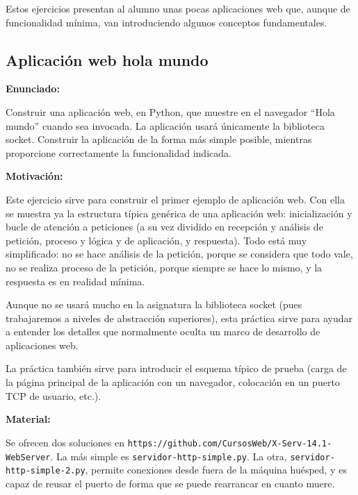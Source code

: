 Estos ejercicios presentan al alumno unas pocas aplicaciones web que, aunque de funcionalidad mínima, van introduciendo algunos conceptos fundamentales.

\subsection{Aplicación web hola mundo}
\label{subsec:aplweb-hola-mundo}

\textbf{Enunciado:}

Construir una aplicación web, en Python, que muestre en el navegador ``Hola mundo'' cuando sea invocada. La aplicación usará únicamente la biblioteca socket. Construir la aplicación de la forma más simple posible, mientras proporcione correctamente la funcionalidad indicada.

\textbf{Motivación:}

Este ejercicio sirve para construir el primer ejemplo de aplicación web. Con ella se muestra ya la estructura típica genérica de una aplicación web: inicialización y bucle de atención a peticiones (a su vez dividido en recepción y análisis de petición, proceso y lógica y de aplicación, y respuesta). Todo está muy simplificado: no se hace análisis de la petición, porque se considera que todo vale, no se realiza proceso de la petición, porque siempre se hace lo mismo, y la respuesta es en realidad mínima.

Aunque no se usará mucho en la asignatura la biblioteca socket (pues trabajaremos a niveles de abstracción superiores), esta práctica sirve para ayudar a entender los detalles que normalmente oculta un marco de desarrollo de aplicaciones web.

La práctica también sirve para introducir el esquema típico de prueba (carga de la página principal de la aplicación con un navegador, colocación en un puerto TCP de usuario, etc.).

\textbf{Material:}

Se ofrecen dos soluciones en \verb|https://github.com/CursosWeb/X-Serv-14.1-WebServer|. La más simple es \verb|servidor-http-simple.py|. La otra, \verb|servidor-http-simple-2.py|, permite conexiones desde fuera de la máquina huésped, y es capaz de reusar el puerto de forma que se puede rearrancar en cuanto muere.


